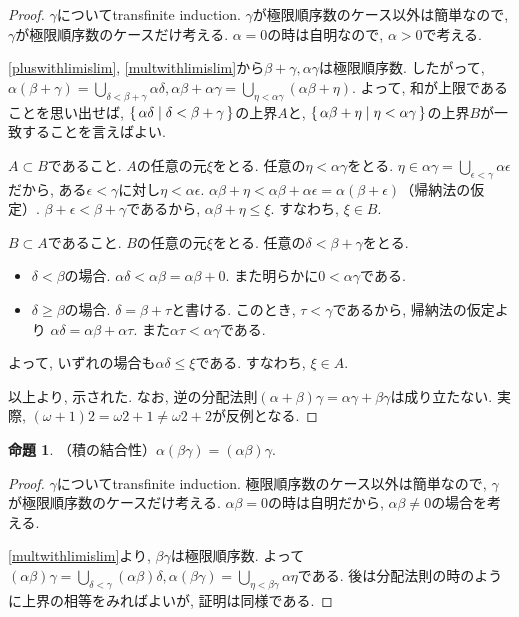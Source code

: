 \documentclass[a4paper, twoside]{bxjsarticle}
\theoremstyle{definition}
\newtheorem{prop}[thm]{命題}
\begin{document}
        \begin{proof}
            $\gamma$についてtransfinite induction. $\gamma$が極限順序数のケース以外は簡単なので, $\gamma$が極限順序数のケースだけ考える. $\alpha=0$の時は自明なので, $\alpha>0$で考える.
            
            \ref{pluswithlimislim}, \ref{multwithlimislim}から$\beta+\gamma, \alpha\gamma$は極限順序数. したがって, $\alpha(\beta+\gamma)=\bigcup_{\delta<\beta+\gamma}\alpha\delta, \alpha\beta+\alpha\gamma=\bigcup_{\eta<\alpha\gamma}(\alpha\beta+\eta)$. よって, 和が上限であることを思い出せば, $\set{\alpha\delta|\delta<\beta+\gamma}$の上界$A$と, $\set{\alpha\beta+\eta|\eta<\alpha\gamma}$の上界$B$が一致することを言えばよい.
            
            $A\subset B$であること. $A$の任意の元$\xi$をとる. 任意の$\eta<\alpha\gamma$をとる. $\eta\in\alpha\gamma=\bigcup_{\epsilon<\gamma}\alpha\epsilon$だから, ある$\epsilon<\gamma$に対し$\eta<\alpha\epsilon$. $\alpha\beta+\eta<\alpha\beta+\alpha\epsilon=\alpha(\beta+\epsilon)$（帰納法の仮定）. $\beta+\epsilon<\beta+\gamma$であるから, $\alpha\beta+\eta\leq\xi$. すなわち, $\xi\in B$.
            
            $B\subset A$であること. $B$の任意の元$\xi$をとる. 任意の$\delta<\beta+\gamma$をとる.
            \begin{itemize}
                \item $\delta<\beta$の場合. $\alpha\delta<\alpha\beta=\alpha\beta+0$. また明らかに$0<\alpha\gamma$である.
                \item $\delta\geq\beta$の場合. $\delta=\beta+\tau$と書ける. このとき, $\tau<\gamma$であるから, 帰納法の仮定より $\alpha\delta=\alpha\beta+\alpha\tau$. また$\alpha\tau<\alpha\gamma$である.
            \end{itemize}
            よって, いずれの場合も$\alpha\delta\leq\xi$である. すなわち, $\xi\in A$.
            
            以上より, 示された.
            なお, 逆の分配法則$(\alpha+\beta)\gamma=\alpha\gamma+\beta\gamma$は成り立たない. 実際, $(\omega+1)2 = \omega2+1\neq\omega2+2$が反例となる.
        \end{proof}
        \begin{prop}
            （積の結合性）$\alpha(\beta\gamma)=(\alpha\beta)\gamma$.
        \end{prop}
        \begin{proof}
            $\gamma$についてtransfinite induction. 極限順序数のケース以外は簡単なので, $\gamma$が極限順序数のケースだけ考える. $\alpha\beta=0$の時は自明だから, $\alpha\beta\neq0$の場合を考える.
            
            \ref{multwithlimislim}より, $\beta\gamma$は極限順序数. よって$(\alpha\beta)\gamma=\bigcup_{\delta<\gamma}(\alpha\beta)\delta, \alpha(\beta\gamma)=\bigcup_{\eta<\beta\gamma}\alpha\eta$である. 後は分配法則の時のように上界の相等をみればよいが, 証明は同様である.
        \end{proof}
\end{document}
